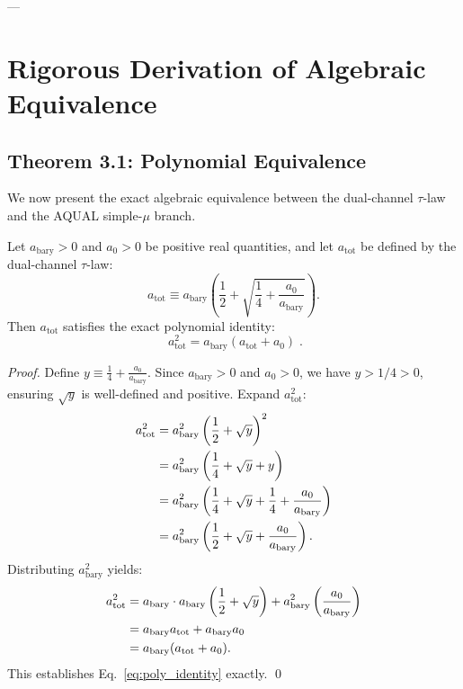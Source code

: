 \documentclass[11pt,a4paper]{article}
\theoremstyle{definition}
\begin{document}
---

\section{Rigorous Derivation of Algebraic Equivalence}

\subsection{Theorem 3.1: Polynomial Equivalence}
We now present the exact algebraic equivalence between the dual-channel $\tau$-law and the AQUAL simple-$\mu$ branch.

\begin{theorem}
\label{thm:poly_equivalence}
Let $a_{\text{bary}} > 0$ and $a_0 > 0$ be positive real quantities, and let $a_{\text{tot}}$ be defined by the dual-channel $\tau$-law:
\begin{equation}
a_{\text{tot}} \equiv a_{\text{bary}} \left( \frac{1}{2} + \sqrt{\frac{1}{4} + \frac{a_0}{a_{\text{bary}}}} \right).
\end{equation}
Then $a_{\text{tot}}$ satisfies the exact polynomial identity:
\begin{equation}
\boxed{\;a_{\text{tot}}^2 = a_{\text{bary}} (a_{\text{tot}} + a_0)\;}.
\label{eq:poly_identity}
\end{equation}
\end{theorem}

\begin{proof}
Define $y \equiv \frac{1}{4} + \frac{a_0}{a_{\text{bary}}}$. Since $a_{\text{bary}} > 0$ and $a_0 > 0$, we have $y > 1/4 > 0$, ensuring $\sqrt{y}$ is well-defined and positive. Expand $a_{\text{tot}}^2$:
\begin{align}
a_{\text{tot}}^2 &= a_{\text{bary}}^2 \left( \frac{1}{2} + \sqrt{y} \right)^2 \notag \\
&= a_{\text{bary}}^2 \left( \frac{1}{4} + \sqrt{y} + y \right) \notag \\
&= a_{\text{bary}}^2 \left( \frac{1}{4} + \sqrt{y} + \frac{1}{4} + \frac{a_0}{a_{\text{bary}}} \right) \notag \\
&= a_{\text{bary}}^2 \left( \frac{1}{2} + \sqrt{y} + \frac{a_0}{a_{\text{bary}}} \right).
\end{align}
Distributing $a_{\text{bary}}^2$ yields:
\begin{align}
a_{\text{tot}}^2 &= a_{\text{bary}} \cdot a_{\text{bary}} \left( \frac{1}{2} + \sqrt{y} \right) + a_{\text{bary}}^2 \left( \frac{a_0}{a_{\text{bary}}} \right) \notag \\
&= a_{\text{bary}} a_{\text{tot}} + a_{\text{bary}} a_0 \notag \\
&= a_{\text{bary}} (a_{\text{tot}} + a_0).
\end{align}
This establishes Eq.~\eqref{eq:poly_identity} exactly. \qed
\end{proof}
\end{document}
